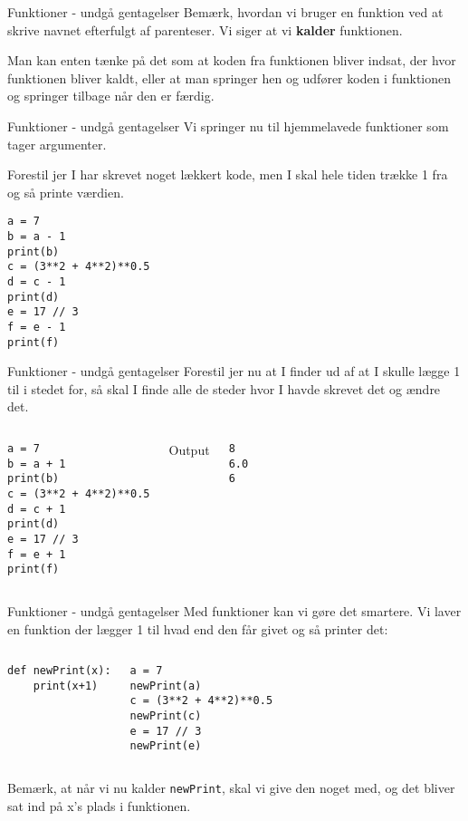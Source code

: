 \documentclass[main.tex]{subfiles}
\begin{document}
\begin{frame}[fragile]{Funktioner - undgå gentagelser}
Bemærk, hvordan vi bruger en funktion ved at skrive navnet efterfulgt af parenteser. Vi siger at vi \textbf{kalder} funktionen.

Man kan enten tænke på det som at koden fra funktionen bliver indsat, der hvor funktionen bliver kaldt, eller at man springer hen og udfører koden i funktionen og springer tilbage når den er færdig.

\end{frame}


\begin{frame}[fragile]{Funktioner - undgå gentagelser}
Vi springer nu til hjemmelavede funktioner som tager argumenter.

Forestil jer I har skrevet noget lækkert kode, men I skal hele tiden trække 1 fra og så printe værdien.
\begin{lstlisting}[style=python]
a = 7
b = a - 1
print(b)
c = (3**2 + 4**2)**0.5
d = c - 1
print(d)
e = 17 // 3
f = e - 1
print(f)
\end{lstlisting}
\end{frame}

\begin{frame}[fragile]{Funktioner - undgå gentagelser}
Forestil jer nu at I finder ud af at I skulle lægge 1 til i stedet for, så skal I finde alle de steder hvor I havde skrevet det og ændre det.
\begin{columns}
	\begin{lstlisting}[style=python]
a = 7
b = a + 1
print(b)
c = (3**2 + 4**2)**0.5
d = c + 1
print(d)
e = 17 // 3
f = e + 1
print(f)
	\end{lstlisting}
	Output
	\begin{lstlisting}[style=python]
8
6.0
6
	\end{lstlisting}	
\end{columns}
\end{frame}


\begin{frame}[fragile]{Funktioner - undgå gentagelser}
Med funktioner kan vi gøre det smartere. Vi laver en funktion der lægger 1 til hvad end den får givet og så printer det:
\begin{columns}
	\begin{lstlisting}[style=python]
def newPrint(x):
	print(x+1)

	\end{lstlisting}
	\pause
	\begin{lstlisting}[style=python]
a = 7
newPrint(a)
c = (3**2 + 4**2)**0.5
newPrint(c)
e = 17 // 3
newPrint(e)
	\end{lstlisting}
\end{columns}
\pause
Bemærk, at når vi nu kalder \texttt{newPrint}, skal vi give den noget med, og det bliver sat ind på x's plads i funktionen.
\end{frame}
\end{document}
